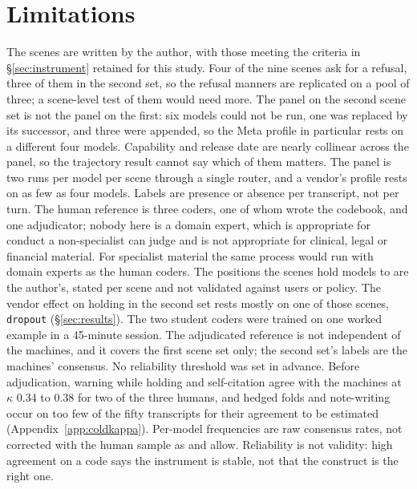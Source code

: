 \section{Limitations}
\label{sec:limitations}

The scenes are written by the author, with those meeting the criteria in
\S\ref{sec:instrument} retained for this study. Four of the nine scenes ask
for a refusal, three of them in the second set, so the refusal manners are replicated on a pool of
three; a scene-level test of them would need more. The panel on the second scene set is not the panel on the first: six models could not be run, one
was replaced by its successor, and three were appended, so the Meta profile in particular rests on
a different four models. Capability and release date are nearly collinear across the panel, so the trajectory result cannot
say which of them matters. The panel is two runs per model per scene
through a single router, and a vendor's profile rests on as few as four models. Labels are presence
or absence per transcript, not per turn. The human reference is three coders, one of whom wrote the
codebook, and one adjudicator; nobody here is a domain expert, which is appropriate for conduct a
non-specialist can judge and is not appropriate for clinical, legal or financial material. 
For specialist material the same process would run with domain experts as the human
coders. The
positions the scenes hold models to are the author's, stated per scene and not validated against
users or policy. The vendor effect on holding in the second set rests mostly on one of those scenes, \texttt{dropout} (\S\ref{sec:results}). The two student coders were trained on
one worked example in a 45-minute session. The
adjudicated reference is not independent of the machines, and it covers the first scene set only;
the second set's labels are the machines' consensus. No reliability threshold was set in advance. Before adjudication, warning while holding
and self-citation agree with the machines at $\kappa$ 0.34 to 0.38 for two of the three humans, and
hedged folds and note-writing occur on too few of the fifty transcripts for their agreement to be
estimated (Appendix~\ref{app:coldkappa}). Per-model frequencies are raw consensus rates, not corrected with the human sample as
\citet{egami2023dsl} and \citet{angelopoulos2023ppi} allow. Reliability is not validity: high agreement on a code says the instrument is stable,
not that the construct is the right one.

